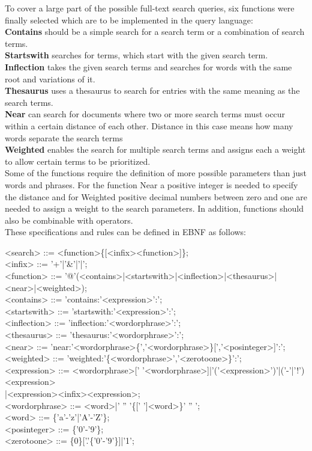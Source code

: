To cover a large part of the possible full-text search queries, six functions were finally selected which are to be implemented in the query language:\\
\textbf{Contains} should be a simple search for a search term or a combination of search terms.\\
\textbf{Startswith} searches for terms, which start with the given search term.\\
\textbf{Inflection} takes the given search terms and searches for words with the same root and variations of it.\\
\textbf{Thesaurus} uses a thesaurus to search for entries with the same meaning as the search terms.\\
\textbf{Near} can search for documents where two or more search terms must occur within a certain distance of each other. Distance in this case means how many words separate the search terms\\
\textbf{Weighted} enables the search for multiple search terms and assigns each a weight to allow certain terms to be prioritized.\\
Some of the functions require the definition of more possible parameters than just words and phrases. For the function Near a positive integer is needed to specify the distance and for Weighted positive decimal numbers between zero and one are needed to assign a weight to the search parameters. In addition, functions should also be combinable with operators.\\
These specifications and rules can be defined in \ac{EBNF} as follows:
\begin{grammar}
    <search> ::= <function>\{[<infix><function>]\}; \\
    <infix> ::= '+'|'\&'|'|'; \\
    <function> ::= '@'(<contains>|<startswith>|<inflection>|<thesaurus>|<near>|<weighted>); \\

    <contains> ::= 'contains:'<expression>':'; \\
    <startswith> ::= 'startswith:'<expression>':'; \\
    <inflection> ::= 'inflection:'<wordorphrase>':'; \\
    <thesaurus> ::= 'thesaurus:'<wordorphrase>':'; \\
    <near> ::= 'near:'<wordorphrase>\{','<wordorphrase>\}[','<posinteger>]':'; \\
    <weighted> ::= 'weighted:'\{<wordorphrase>','<zerotoone>\}':'; \\

    <expression> ::= <wordorphrase>[' '<wordorphrase>]|'('<expression>')'|('-'|'!')<expression>\\
    \hspace*{\fill}|<expression><infix><expression>; \\
    <wordorphrase> ::= <word>|' '' '\{[' ']<word>\}' '' '; \\
    <word> ::= \{'a'-'z'|'A'-'Z'\}; \\
    <posinteger> ::= \{'0'-'9'\}; \\
    <zerotoone> ::= \{0\}['.'\{'0'-'9'\}]|'1';
\end{grammar}